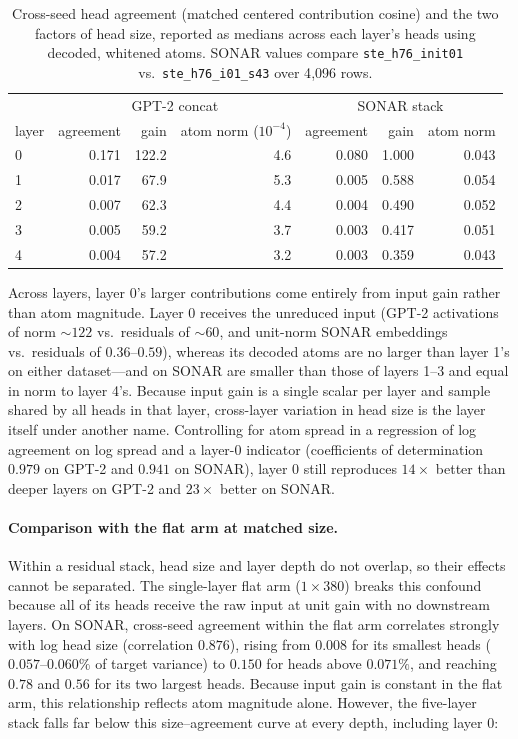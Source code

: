 \begin{table}[htbp]\centering\small
\begin{tabular}{@{}lrrrrrr@{}}
\toprule
& \multicolumn{3}{c}{GPT-2 concat} & \multicolumn{3}{c}{SONAR stack} \\
layer & agreement & gain & atom norm ($10^{-4}$) & agreement & gain & atom norm \\
\midrule
0 & 0.171 & 122.2 & 4.6 & 0.080 & 1.000 & 0.043 \\
1 & 0.017 & 67.9 & 5.3 & 0.005 & 0.588 & 0.054 \\
2 & 0.007 & 62.3 & 4.4 & 0.004 & 0.490 & 0.052 \\
3 & 0.005 & 59.2 & 3.7 & 0.003 & 0.417 & 0.051 \\
4 & 0.004 & 57.2 & 3.2 & 0.003 & 0.359 & 0.043 \\
\bottomrule
\end{tabular}
\caption{Cross-seed head agreement (matched centered contribution cosine)
and the two factors of head size, reported as medians across each layer's
heads using decoded, whitened atoms. SONAR values compare
\texttt{ste\_h76\_init01} vs.\ \texttt{ste\_h76\_i01\_s43} over 4{,}096
rows.}
\label{tab:gainatoms}
\end{table}

Across layers, layer 0's larger contributions come entirely from input
gain rather than atom magnitude. Layer 0 receives the unreduced input
(GPT-2 activations of norm ${\sim}122$ vs.\ residuals of ${\sim}60$, and
unit-norm SONAR embeddings vs.\ residuals of $0.36$--$0.59$), whereas its
decoded atoms are no larger than layer 1's on either dataset---and on
SONAR are smaller than those of layers 1--3 and equal in norm to
layer 4's. Because input gain is a single scalar per layer and sample
shared by all heads in that layer, cross-layer variation in head size is
the layer itself under another name. Controlling for atom spread in a
regression of log agreement on log spread and a layer-0 indicator
(coefficients of determination $0.979$ on GPT-2 and $0.941$ on SONAR),
layer 0 still reproduces $14\times$ better than deeper layers on GPT-2 and
$23\times$ better on SONAR.

\paragraph{Comparison with the flat arm at matched size.} Within a
residual stack, head size and layer depth do not overlap, so their
effects cannot be separated. The single-layer flat arm ($1\times380$) breaks
this confound because all of its heads receive the raw input at unit gain
with no downstream layers. On SONAR, cross-seed agreement within the flat
arm correlates strongly with log head size (correlation $0.876$), rising
from $0.008$ for its smallest heads ($0.057$--$0.060\%$ of target
variance) to $0.150$ for heads above $0.071\%$, and reaching $0.78$ and
$0.56$ for its two largest heads. Because input gain is constant in the
flat arm, this relationship reflects atom magnitude alone. However, the
five-layer stack falls far below this size--agreement curve at every
depth, including layer 0:

